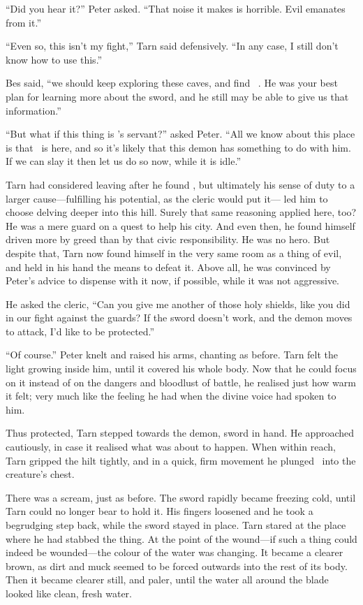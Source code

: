 ``Did you hear it?''  Peter asked.  ``That noise it makes is horrible.  Evil emanates from it.''

``Even so, this isn't my fight,'' Tarn said defensively.  ``In any case, I still don't know how to use this.''

Bes said, ``we should keep exploring these caves, and find \mothzam\ \driktur.  He was your best plan for learning more about the sword, and he still may be able to give us that information.''

``But what if this thing is \mothzam's servant?'' asked Peter.  ``All we know about this place is that \mothzam\ is here, and so it's likely that this demon has something to do with him.  If we can slay it then let us do so now, while it is idle.''

Tarn had considered leaving after he found \kildir, but ultimately his sense of duty to a larger cause---fulfilling his potential, as the cleric would put it--- led him to choose delving deeper into this hill.  Surely that same reasoning applied here, too?  He was a mere guard on a quest to help his city.  And even then, he found himself driven more by greed than by that civic responsibility. He was no hero. But despite that, Tarn now found himself in the very same room as a thing of evil, and held in his hand the means to defeat it.  Above all, he was convinced by Peter's advice to dispense with it now, if possible, while it was not aggressive.

He asked the cleric, ``Can you give me another of those holy shields, like you did in our fight against the guards?  If the sword doesn't work, and the demon moves to attack, I'd like to be protected.''

``Of course.''  Peter knelt and raised his arms, chanting as before.  Tarn felt the light growing inside him, until it covered his whole body.  Now that he could focus on it instead of on the dangers and bloodlust of battle, he realised just how warm it felt; very much like the feeling he had when the divine voice had spoken to him.

Thus protected, Tarn stepped towards the demon, sword in hand.  He approached cautiously, in case it realised what was about to happen.  When within reach, Tarn gripped the hilt tightly, and in a quick, firm movement he plunged \kildir\ into the creature's chest.

There was a scream, just as before.  The sword rapidly became freezing cold, until Tarn could no longer bear to hold it.  His fingers loosened and he took a begrudging step back, while the sword stayed in place.  Tarn stared at the place where he had stabbed the thing.  At the point of the wound---if such a thing could indeed be wounded---the colour of the water was changing.  It became a clearer brown, as dirt and muck seemed to be forced outwards into the rest of its body.  Then it became clearer still, and paler, until the water all around the blade looked like clean, fresh water.

